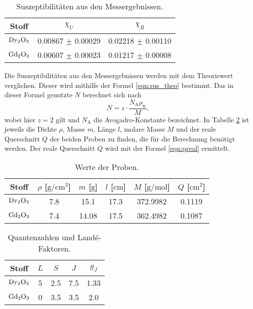 \begin{table}
  \centering
  \caption{Suszeptibilitäten aus den Messergebnissen.}
  \label{tab:Suszeptibilität_Praxis}
  \begin{tabular}{c c c}
    \toprule
    {Stoff} & {$\chi_U$} & {$\chi_R$} \\
    \midrule
    $\ce{Dy2O3}$ & 0.00867 $\pm$ 0.00029 & 0.02218 $\pm$ 0.00110 \\
    $\ce{Gd2O3}$ & 0.00607 $\pm$ 0.00023 & 0.01217 $\pm$ 0.00008 \\
    \bottomrule
  \end{tabular}
\end{table}
\noindent
Die Suszeptibilitäten aus den Messergebnissen werden mit dem Theoriewert verglichen.
Dieser wird mithilfe der Formel \eqref{eqn:sus_theo} bestimmt.
Das in dieser Formel genutzte $N$ berechnet sich nach
\begin{equation*}
  N = z \cdot \frac{N_{\text{A}} \rho_{\text{w}}}{M},
\end{equation*}
wobei hier $z = \num{2}$ gilt und $N_{\text{A}}$ die Avogadro-Konstante bezeichnet.
In Tabelle \ref{tab:Proben} ist jeweils die Dichte $\rho$, Masse $m$, Länge $l$, molare Masse $M$ und der reale Querschnitt $Q$ der beiden Proben zu finden, die für die Berechnung benötigt werden.
Der reale Querschnitt $Q$ wird mit der Formel \eqref{eqn:qreal} ermittelt.

\begin{table}
  \centering
  \caption{Werte der Proben.}
  \label{tab:Proben}
  \begin{tabular}{c c c c c c }
    \toprule
    {Stoff} & {$\rho$ [$\si{\gram\per\centi\metre\cubed}$]} & {$m$ [$\si{\gram}$]} & {$l$ [$\si{\centi\metre}$]} & {$M$ [$\si{\gram\per\mole}$]} & {$Q$ [$\si{\centi\metre\squared}$]}\\
    \midrule
    $\ce{Dy2O3}$ & 7.8 & 15.1 & 17.3 & 372.9982 & 0.1119\\
    $\ce{Gd2O3}$ & 7.4 & 14.08 & 17.5 & 362.4982 & 0.1087\\
    \bottomrule
  \end{tabular}
\end{table}

\begin{table}
  \centering
  \caption{Quantenzahlen und Landé-Faktoren.}
  \begin{tabular}{c c c c c }
    \toprule
    {Stoff} & {$L$} & {$S$} & {$J$} & {$g_J$}\\
    \midrule
    $\ce{Dy2O3}$ & 5 & 2.5 & 7.5 & 1.33\\
    $\ce{Gd2O3}$ & 0 & 3.5 & 3.5 & 2.0\\
    \bottomrule
  \end{tabular}
\end{table}

